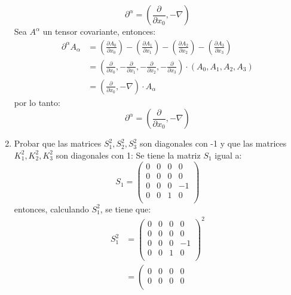 \documentclass[12pt,letterpaper]{report}
\begin{document}
\begin{enumerate}
\begin{equation*}
        \partial^\alpha = \left(\frac{\partial}{\partial x_0}, -\nabla  \right)
    \end{equation*}
    Sea $A^\alpha$ un tensor covariante, entonces:
    \begin{align*}
        \partial^\alpha A_\alpha &= \left(\frac{\partial A_0}{\partial x_0} \right)-\left(\frac{\partial A_1}{\partial x_1} \right)-\left(\frac{\partial A_2}{\partial x_2} \right)-\left(\frac{\partial A_3}{\partial x_3} \right)\\
        &= \left(\frac{\partial}{\partial x_0},-\frac{\partial}{\partial x_1},-\frac{\partial}{\partial x_2},-\frac{\partial}{\partial x_3} \right) \cdot (A_0,A_1,A_2,A_3)\\
        &= \left(\frac{\partial}{\partial x_0},-\nabla \right) \cdot A_\alpha
    \end{align*}
    por lo tanto:
    \begin{equation*}
        \partial^\alpha = \left(\frac{\partial}{\partial x_0}, -\nabla  \right)
    \end{equation*}
    \item Probar que las matrices $S_1^2,S_2^2,S_3^2$ son diagonales con -1 y que las matrices $K_1^2,K_2^2,K_3^2$ son diagonales con 1:
    Se tiene la matriz $S_1$ igual a:
    \begin{equation*}
        S_1 =\left( \begin{matrix}
            0 & 0 & 0 & 0 \\
            0 & 0 & 0 & 0 \\
            0 & 0 & 0 & -1 \\
            0 & 0 & 1 & 0 \\
        \end{matrix}\right)
    \end{equation*}
    entonces, calculando $S_1^2$, se tiene que:
    \begin{align*}
        S_1^2 &=\left( \begin{matrix}
            0 & 0 & 0 & 0 \\
            0 & 0 & 0 & 0 \\
            0 & 0 & 0 & -1 \\
            0 & 0 & 1 & 0 \\
        \end{matrix}\right)^2 \\
        & =\left( \begin{matrix}
            0 & 0 & 0 & 0 \\
            0 & 0 & 0 & 0 \\

\end{matrix}
\end{align*}
\end{enumerate}
\end{document}
